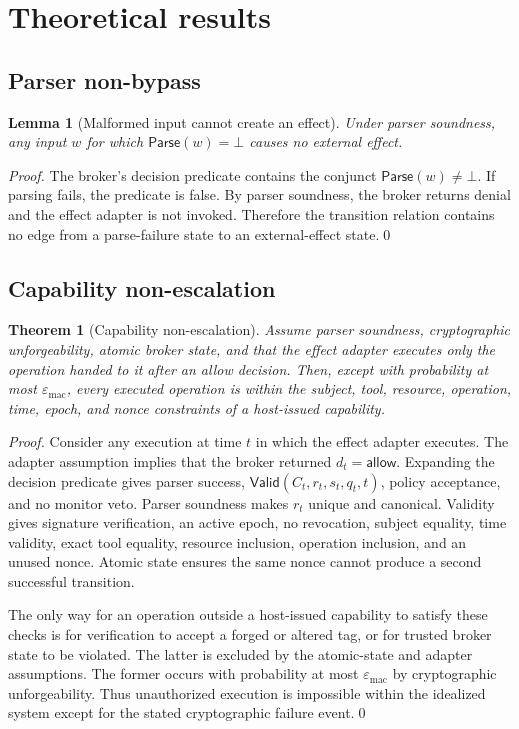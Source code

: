 \documentclass[11pt]{article}
\newtheorem{lemma}[definition]{Lemma}
\newtheorem{theorem}[definition]{Theorem}
\newcommand{\1}{\mathbf{1}}
\begin{document}
\section{Theoretical results}

\subsection{Parser non-bypass}
\begin{lemma}[Malformed input cannot create an effect]
Under parser soundness, any input $w$ for which $\mathsf{Parse}(w)=\bot$ causes no external effect.
\end{lemma}
\begin{proof}
The broker's decision predicate contains the conjunct $\mathsf{Parse}(w)\neq\bot$. If parsing fails, the predicate is false. By parser soundness, the broker returns denial and the effect adapter is not invoked. Therefore the transition relation contains no edge from a parse-failure state to an external-effect state.\qed
\end{proof}

\subsection{Capability non-escalation}
\begin{theorem}[Capability non-escalation]
Assume parser soundness, cryptographic unforgeability, atomic broker state, and that the effect adapter executes only the operation handed to it after an allow decision. Then, except with probability at most $\varepsilon_{\mathrm{mac}}$, every executed operation is within the subject, tool, resource, operation, time, epoch, and nonce constraints of a host-issued capability.
\end{theorem}
\begin{proof}
Consider any execution at time $t$ in which the effect adapter executes. The adapter assumption implies that the broker returned $d_t=\mathsf{allow}$. Expanding the decision predicate gives parser success, $\mathsf{Valid}(C_t,r_t,s_t,q_t,t)$, policy acceptance, and no monitor veto. Parser soundness makes $r_t$ unique and canonical. Validity gives signature verification, an active epoch, no revocation, subject equality, time validity, exact tool equality, resource inclusion, operation inclusion, and an unused nonce. Atomic state ensures the same nonce cannot produce a second successful transition.

The only way for an operation outside a host-issued capability to satisfy these checks is for verification to accept a forged or altered tag, or for trusted broker state to be violated. The latter is excluded by the atomic-state and adapter assumptions. The former occurs with probability at most $\varepsilon_{\mathrm{mac}}$ by cryptographic unforgeability. Thus unauthorized execution is impossible within the idealized system except for the stated cryptographic failure event.\qed
\end{proof}
\end{document}
